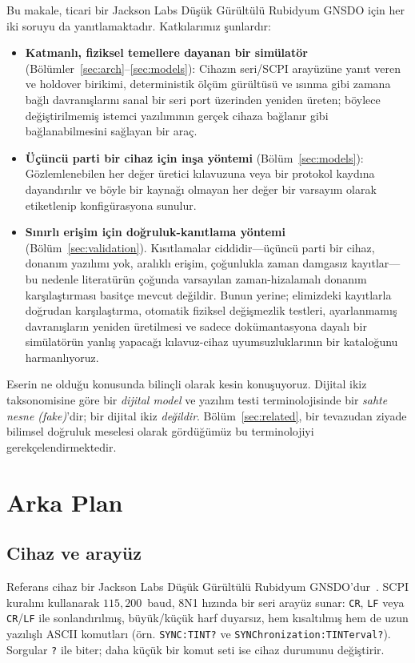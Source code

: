 \documentclass[conference]{IEEEtran}
\begin{document}
Bu makale, ticari bir Jackson Labs Düşük Gürültülü Rubidyum GNSDO için her iki soruyu da yanıtlamaktadır. Katkılarımız şunlardır:
\begin{itemize}
\item \textbf{Katmanlı, fiziksel temellere dayanan bir simülatör} (Bölümler~\ref{sec:arch}--\ref{sec:models}): Cihazın seri/SCPI arayüzüne yanıt veren ve holdover birikimi, deterministik ölçüm gürültüsü ve ısınma gibi zamana bağlı davranışlarını sanal bir seri port üzerinden yeniden üreten; böylece değiştirilmemiş istemci yazılımının gerçek cihaza bağlanır gibi bağlanabilmesini sağlayan bir araç.
\item \textbf{Üçüncü parti bir cihaz için inşa yöntemi} (Bölüm~\ref{sec:models}): Gözlemlenebilen her değer üretici kılavuzuna veya bir protokol kaydına dayandırılır ve böyle bir kaynağı olmayan her değer bir varsayım olarak etiketlenip konfigürasyona sunulur.
\item \textbf{Sınırlı erişim için doğruluk-kanıtlama yöntemi} (Bölüm~\ref{sec:validation}). Kısıtlamalar ciddidir---üçüncü parti bir cihaz, donanım yazılımı yok, aralıklı erişim, çoğunlukla zaman damgasız kayıtlar---bu nedenle literatürün çoğunda varsayılan zaman-hizalamalı donanım karşılaştırması basitçe mevcut değildir. Bunun yerine; elimizdeki kayıtlarla doğrudan karşılaştırma, otomatik fiziksel değişmezlik testleri, ayarlanmamış davranışların yeniden üretilmesi ve sadece dokümantasyona dayalı bir simülatörün yanlış yapacağı kılavuz-cihaz uyumsuzluklarının bir kataloğunu harmanlıyoruz.
\end{itemize}

Eserin ne olduğu konusunda bilinçli olarak kesin konuşuyoruz. Dijital ikiz taksonomisine göre bir \emph{dijital model} ve yazılım testi terminolojisinde bir \emph{sahte nesne (fake)}'dir; bir dijital ikiz \emph{değildir}. Bölüm~\ref{sec:related}, bir tevazudan ziyade bilimsel doğruluk meselesi olarak gördüğümüz bu terminolojiyi gerekçelendirmektedir.

\section{Arka Plan}
\label{sec:background}
\subsection{Cihaz ve arayüz}
Referans cihaz bir Jackson Labs Düşük Gürültülü Rubidyum GNSDO'dur~\cite{jacksonlabs2015lnrb}. SCPI kuralını kullanarak $115{,}200$~baud, 8N1 hızında bir seri arayüz sunar: \texttt{CR}, \texttt{LF} veya \texttt{CR}/\texttt{LF} ile sonlandırılmış, büyük/küçük harf duyarsız, hem kısaltılmış hem de uzun yazılışlı ASCII komutları (örn. \texttt{SYNC:TINT?} ve \texttt{SYNChronization:TINTerval?}). Sorgular \texttt{?} ile biter; daha küçük bir komut seti ise cihaz durumunu değiştirir.
\end{document}
